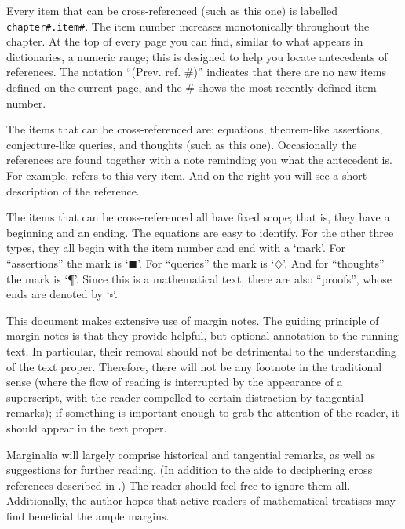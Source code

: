 \documentclass[noocg]{wwwnotes2}
\begin{document}
\begin{thot}
Every item that can be cross-referenced (such as this one) is labelled \texttt{chapter\#.item\#}. 
The item number increases monotonically throughout the chapter. At the top of every page you can find, similar to what appears in dictionaries, a numeric range; this is designed to help you locate antecedents of references. 
The notation ``(Prev. ref. \#)'' indicates that there are no new items defined on the current page, and the \# shows the most recently defined item number. 

The items that can be cross-referenced are: equations, theorem-like assertions, conjecture-like queries, and thoughts (such as this one). 
Occasionally the references are found together with a note reminding you what the antecedent is. For example,  refers to this very item. 
And on the right you will see a short description of the reference. 

The items that can be cross-referenced all have fixed scope; that is, they have a beginning and an ending. 
The equations are easy to identify. For the other three types, they all begin with the item number and end with a `mark'. For 
``assertions'' 
the mark is `\(\blacksquare\)'. For ``queries'' the mark is `\(\diamondsuit\)'. And for ``thoughts'' the mark is `\P'. Since this is a mathematical text, there are also ``proofs'', whose ends are denoted by `\(\square\)`. 
\end{thot}

\begin{thot}
This document makes extensive use of margin notes. The guiding principle of margin notes is that they provide helpful, but optional annotation to the running text. In particular, their removal should not be detrimental to the understanding of the text proper. 
Therefore, there will not be any footnote in the traditional sense (where the flow of reading is interrupted by the appearance of a superscript, with the reader compelled to certain distraction by tangential remarks); if something is important enough to grab the attention of the reader, it should appear in the text proper. 

Marginalia will largely comprise historical and tangential remarks, as well as suggestions for further reading. (In addition to the aide to deciphering cross references described in .)  The reader should feel free to ignore them all.
Additionally, the author hopes that active readers of mathematical treatises may find beneficial the ample margins. 
\end{thot}
\end{document}
